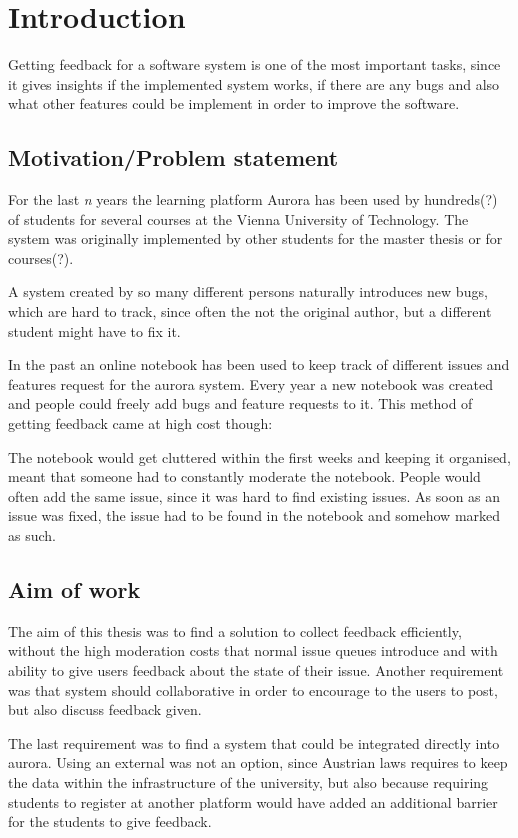 \chapter{Introduction}

Getting feedback for a software system is one of the most important tasks, since it gives insights if the implemented system works, if there are any bugs and also what other features could be implement in order to improve the software.

\section{Motivation/Problem statement}

For the last \emph{n} years the learning platform Aurora has been used by hundreds(?) of students for several courses at the Vienna University of Technology. The system was originally implemented by other students for the master thesis or for courses(?).

A system created by so many different persons naturally introduces new bugs, which are hard to track, since often the not the original author, but a different student might have to fix it.

In the past an online notebook has been used to keep track of different issues and features request for the aurora system. Every year a new notebook was created and people could freely add bugs and feature requests to it. This method of getting feedback came at high cost though:

The notebook would get cluttered within the first weeks and keeping it organised, meant that someone had to constantly moderate the notebook.
People would often add the same issue, since it was hard to find existing issues.
As soon as an issue was fixed, the issue had to be found in the notebook and somehow marked as such. 


\section{Aim of work}

The aim of this thesis was to find a solution to collect feedback efficiently, without the high moderation costs that normal issue queues introduce and with ability to give users feedback about the state of their issue. Another requirement was that system should collaborative in order to encourage to the users to post, but also discuss feedback given.

The last requirement was to find a system that could be integrated directly into aurora. Using an external was not an option, since Austrian laws requires to keep the data within the infrastructure of the university, but also because requiring students to register at another platform would have added an additional barrier for the students to give feedback.